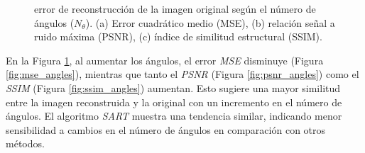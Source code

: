 \documentclass[11pt, twocolumn]{article}
\begin{document}
\begin{figure}[htbp]
  \centering
  \hfill
  \hfill
  \hfill
  \caption{error de reconstrucción de la imagen original según el número de ángulos ($N_\theta$). (a) Error cuadrático medio (MSE), (b) relación señal a ruido máxima (PSNR), (c) índice de similitud estructural (SSIM).}
  \label{fig:ej_2_angles}
\end{figure}

En la Figura \ref{fig:ej_2_angles}, al aumentar los ángulos, el error \textit{MSE} disminuye (Figura \ref{fig:mse_angles}), mientras que tanto el \textit{PSNR} (Figura \ref{fig:psnr_angles}) como el \textit{SSIM} (Figura \ref{fig:ssim_angles}) aumentan. Esto sugiere una mayor similitud entre la imagen reconstruida y la original con un incremento en el número de ángulos. El algoritmo \textit{SART} muestra una tendencia similar, indicando menor sensibilidad a cambios en el número de ángulos en comparación con otros métodos.
\end{document}
